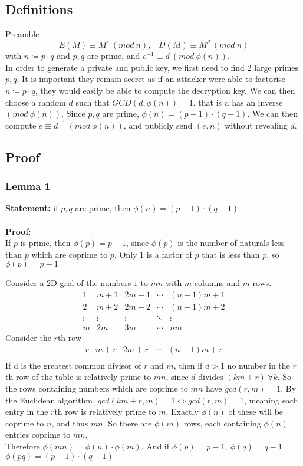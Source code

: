\documentclass{article}
\begin{document}
\subsection{Definitions}
Preamble
\[ E(M) \equiv M^e \: (mod \: n),\;\;\; D(M) \equiv M^d \: (mod \: n)\]
with $ n \coloneqq p \cdot q $ and $p, q$ are prime, and $e^{-1} \equiv d \: (mod \: \phi (n))$. \\
In order to generate a private and public key, we first need to find 2 large primes $p, q$.
It is important they remain secret as if an attacker were able to factorise
$ n \coloneqq p \cdot q $,
they would easily be able to compute the decryption key. We can then choose a random $d$ such that $GCD(d, \phi (n)) = 1$,
that is d has an inverse $(mod \: \phi(n))$.
Since $p, q$ are prime, $\phi(n) = (p-1) \cdot (q-1) $.
We can then compute $e \equiv d^{-1} \: (mod \: \phi(n))$,
and publicly send $(e, n)$ without revealing $d$.

\subsection{Proof}
\subsubsection{Lemma 1}
\textbf{Statement:} if $p, q$ are prime, then $\phi(n) = (p-1) \cdot (q-1)$ \\\\
\textbf{Proof:} \\
If $p$ is prime, then $ \phi(p) = p-1 $,
since $\phi(p)$ is the number of naturals less than $p$ which are coprime to $p$.
Only 1 is a factor of $p$ that is less than $p$, so $\phi(p) = p-1$

Consider a 2D grid of the numbers $1$ to $mn$ with $m$ columns and $m$ rows.
\[
    \begin{matrix}
        1      & m + 1  & 2m + 1 & \cdots & (n-1)m + 1 \\
        2      & m + 2  & 2m + 2 & \cdots & (n-1)m + 2 \\
        \vdots & \vdots & \vdots & \ddots & \vdots     \\
        m      & 2m     & 3m     & \cdots & nm
    \end{matrix}
\]
Consider the $r$th row
\[
    \begin{matrix}
        r & m + r & 2m + r & \cdots & (n-1)m + r \\
    \end{matrix}
\]
If d is the greatest common divisor of $r$ and $m$,  then if $d > 1$
no number in the $r$th row of the table is relatively prime to $mn$,
since $d$ divides $(km +r) \: \forall k$.
So the rows containing numbers which are coprime to $mn$ have $gcd(r, m) = 1$.
By the Euclidean algorithm, $gcd(km +r, m) = 1 \Leftrightarrow gcd(r, m) = 1$,
meaning each entry in the $r$th row is relatively prime to $m$.
Exactly $\phi(n)$ of these will be coprime to $n$, and thus $mn$.
So there are $\phi(m)$ rows, each containing $\phi(n)$ entries coprime to $mn$. \\
Therefore $\phi(mn) = \phi(n) \cdot \phi(m)$.
And if $\phi(p) = p-1, \: \phi(q) = q-1$ \\
$\phi(pq) = (p-1) \cdot (q-1) $
\end{document}
